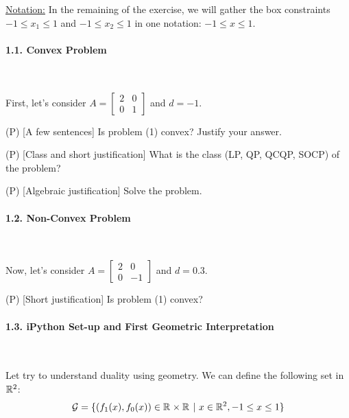 \underline{Notation:} In the remaining of the exercise, we will gather the box constraints $-1 \leq x_1 \leq 1$ and $-1 \leq x_2 \leq 1$ in one notation: $-1 \leq x \leq 1$.

\paragraph{1.1. Convex Problem}\

First, let's consider $A = \begin{bmatrix} 2 & 0 \\ 0 & 1 \end{bmatrix}$ and $d=-1$.

\begin{enumerate}
    \qitem (P) [A few sentences] Is problem (1) convex? Justify your answer.
    
    \sol{}
    \qitem (P) [Class and short justification] What is the class (LP, QP, QCQP, SOCP) of the problem?
    
    \sol{}
    \qitem (P) [Algebraic justification] Solve the problem.
    
    \sol{}
\end{enumerate}

\paragraph{1.2. Non-Convex Problem}\ 

Now, let's consider $A = \begin{bmatrix} 2 & 0 \\ 0 & -1 \end{bmatrix}$ and $d=0.3$.

\begin{enumerate}
    \qitem (P) [Short justification] Is problem (1) convex?
    
    \sol{}
\end{enumerate}

\paragraph{1.3. iPython Set-up and First Geometric Interpretation}\ 

Let try to understand duality using geometry. 
We can define the following set in $\mathbb{R}^{2}$:
\[ \mathcal{G} = \{(f_1(x),f_0(x)) \in \mathbb{R}^{}\times\mathbb{R}^{}\ |\ x\in\mathbb{R}^{2}, -1 \leq x \leq 1\}\]

